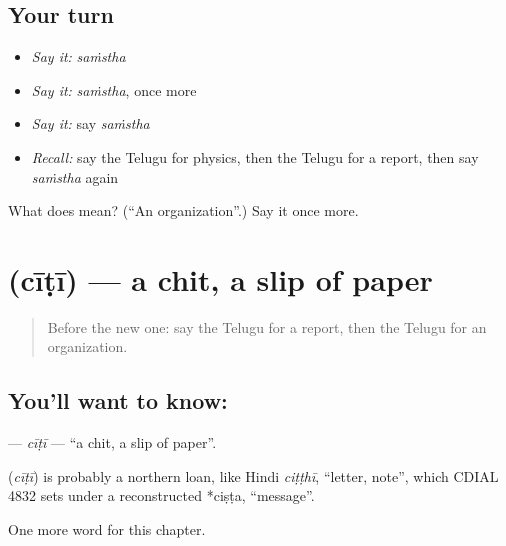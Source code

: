 \subsection*{Your turn}
\begin{itemize}
\raggedright
  \item \emph{Say it:} \emph{saṁstha}
  \item \emph{Say it:} \emph{saṁstha}, once more
  \item \emph{Say it:} say \emph{saṁstha}
  \item \emph{Recall:} say the Telugu for physics, then the Telugu for a report, then say \emph{saṁstha} again
\end{itemize}

\begin{tcolorbox}[breakable,colback=teal!4,colframe=teal!35!black,title={Before you move on}]
What does  mean? (\textquotedblleft{}An organization\textquotedblright{}.) Say it once more.
\end{tcolorbox}
\section[\texorpdfstring{\te{చీటీ} (cīṭī)}{చీటీ (cīṭī)}]{ (cīṭī) — a chit, a slip of paper}

\label{lesson:TE-C239-citi}



\begin{quote}
Before the new one: say the Telugu for a report, then the Telugu for an organization.
\end{quote}

\subsection*{You'll want to know: }
\textbf{} — \emph{cīṭī} — \textquotedblleft{}a chit, a slip of paper\textquotedblright{}.

\begin{cousinweb}
\textbf{} (\emph{cīṭī}) is probably a northern loan, like Hindi \emph{ciṭṭhī}, \textquotedblleft{}letter, note\textquotedblright{}, which CDIAL 4832 sets under a reconstructed *ciṣṭa, \textquotedblleft{}message\textquotedblright{}.
\end{cousinweb}

\begin{grammarlens}[title={What you've built}]
One more word for this chapter.
\end{grammarlens}

